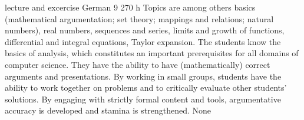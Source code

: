 {lecture and excercise}
{German}
{9}
{270 h}
{Topics are among others basics (mathematical argumentation; set theory; mappings and relations; natural numbers), real numbers, sequences and series, limits and growth of functions, differential and integral equations, Taylor expansion.}
{The students know the basics of analysis, which constitutes an important prerequisites for all domains of computer science. They have the ability to have (mathematically) correct arguments and presentations. By working in small groups, students have the ability to work together on problems and to critically evaluate other students' solutions. By engaging with strictly formal content and tools, argumentative accuracy is developed and stamina is strengthened.}
{None}